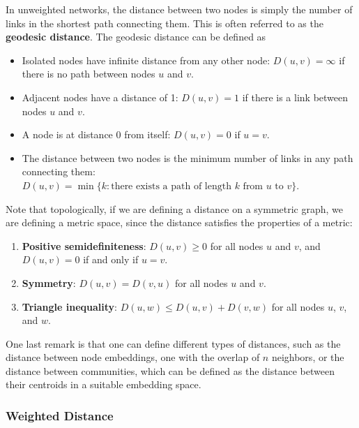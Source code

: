 In unweighted networks, the distance between two nodes is simply the number of links in the shortest path connecting them. This is often referred to as the \textbf{geodesic distance}. The geodesic distance can be defined as
\begin{itemize}
    \item Isolated nodes have infinite distance from any other node: \(D(u,v) = \infty\) if there is no path between nodes \(u\) and \(v\).
    \item Adjacent nodes have a distance of 1: \(D(u,v) = 1\) if there is a link between nodes \(u\) and \(v\).
    \item A node is at distance 0 from itself: \(D(u,v) = 0\) if \(u = v\).
    \item The distance between two nodes is the minimum number of links in any path connecting them: \(D(u,v) = \min\{k : \text{there exists a path of length } k \text{ from } u \text{ to } v\}\).
\end{itemize}

Note that topologically, if we are defining a distance on a symmetric graph, we are defining a metric space, since the distance satisfies the properties of a metric:
\begin{enumerate}
    \item \textbf{Positive semidefiniteness}: \(D(u,v) \geq 0\) for all nodes \(u\) and \(v\), and \(D(u,v) = 0\) if and only if \(u = v\).
    \item \textbf{Symmetry}: \(D(u,v) = D(v,u)\) for all nodes \(u\) and \(v\).
    \item \textbf{Triangle inequality}: \(D(u,w) \leq D(u,v) + D(v,w)\) for all nodes \(u\), \(v\), and \(w\).
\end{enumerate}

One last remark is that one can define different types of distances, such as the distance between node embeddings, one with the overlap of \(n\) neighbors, or the distance between communities, which can be defined as the distance between their centroids in a suitable embedding space.

\subsubsection{Weighted Distance}

